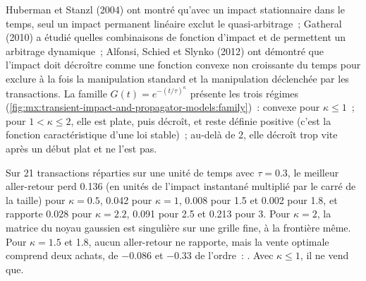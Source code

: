Huberman et Stanzl (2004) ont montré qu'avec un impact stationnaire dans le temps, seul un impact permanent linéaire exclut le quasi-arbitrage~; Gatheral (2010) a étudié quelles
combinaisons de fonction d'impact et de  permettent un arbitrage dynamique~; Alfonsi, Schied et Slynko (2012) ont démontré que l'impact doit décroître comme une fonction convexe
non croissante du temps pour exclure à la fois la manipulation standard et la manipulation déclenchée par les transactions. La famille $G(t)=e^{-(t/\tau)^\kappa}$ présente les
trois régimes (\cref{fig:mx:transient-impact-and-propagator-models:family})~: convexe pour $\kappa\le1$~; pour $1<\kappa\le2$, elle est plate, puis décroît, et
reste définie positive (c'est la fonction caractéristique d'une loi stable)~; au-delà de 2, elle décroît trop vite après un début plat et ne l'est pas.

\label{lst:mx:transient-impact-and-propagator-models:rt}

Sur 21 transactions réparties sur une unité de temps avec $\tau=0.3$, le meilleur aller-retour perd 0.136 (en unités de l'impact instantané multiplié par le carré de la taille) pour
$\kappa=0.5$, 0.042 pour $\kappa=1$, 0.008 pour 1.5 et 0.002 pour 1.8, et rapporte 0.028 pour $\kappa=2.2$, 0.091 pour 2.5 et 0.213 pour 3. Pour $\kappa=2$, la
matrice du noyau gaussien est singulière sur une grille fine, à la frontière même. Pour $\kappa=1.5$ et 1.8, aucun aller-retour ne rapporte, mais la vente optimale comprend deux
achats, de $-0.086$ et $-0.33$ de l'ordre~: . Avec $\kappa\le1$, il ne vend que.

